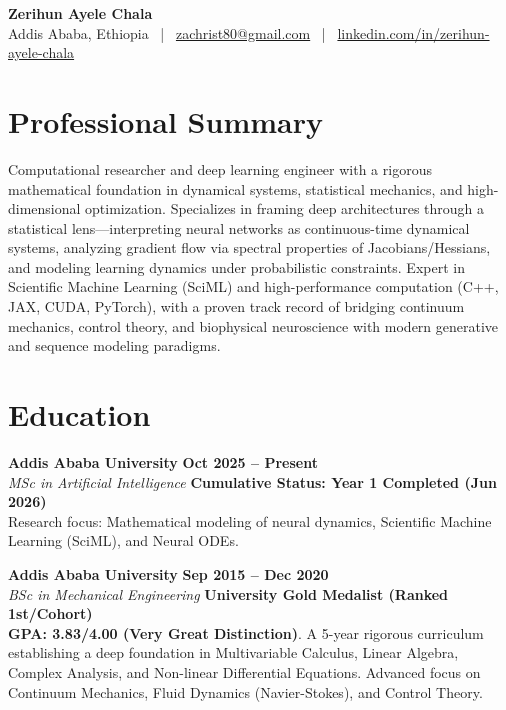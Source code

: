 \documentclass[10pt, letterpaper]{article}
\begin{document}
\begin{center}
    {\Huge \textbf{\color{primary} Zerihun Ayele Chala}} \\
    \vspace{6pt}
    \small
    Addis Ababa, Ethiopia \ | \ 
    \href{mailto:zachrist80@gmail.com}{zachrist80@gmail.com} \ | \ 
    \href{https://www.linkedin.com/in/zerihun-ayele-chala}{linkedin.com/in/zerihun-ayele-chala}
\end{center}

\vspace{-4pt}

\section{Professional Summary}
Computational researcher and deep learning engineer with a rigorous mathematical foundation in dynamical systems, statistical mechanics, and high-dimensional optimization. Specializes in framing deep architectures through a statistical lens—interpreting neural networks as continuous-time dynamical systems, analyzing gradient flow via spectral properties of Jacobians/Hessians, and modeling learning dynamics under probabilistic constraints. Expert in Scientific Machine Learning (SciML) and high-performance computation (C++, JAX, CUDA, PyTorch), with a proven track record of bridging continuum mechanics, control theory, and biophysical neuroscience with modern generative and sequence modeling paradigms.

\section{Education}
\textbf{Addis Ababa University} \hfill \textbf{Oct 2025 -- Present} \\
\textit{MSc in Artificial Intelligence} \hfill \textbf{Cumulative Status: Year 1 Completed (Jun 2026)} \\
Research focus: Mathematical modeling of neural dynamics, Scientific Machine Learning (SciML), and Neural ODEs.

\vspace{6pt}
\textbf{Addis Ababa University} \hfill \textbf{Sep 2015 -- Dec 2020} \\
\textit{BSc in Mechanical Engineering} \hfill \textbf{University Gold Medalist (Ranked 1st/Cohort)} \\
\textbf{GPA: 3.83/4.00 (Very Great Distinction)}. A 5-year rigorous curriculum establishing a deep foundation in Multivariable Calculus, Linear Algebra, Complex Analysis, and Non-linear Differential Equations. Advanced focus on Continuum Mechanics, Fluid Dynamics (Navier-Stokes), and Control Theory.
\end{document}
